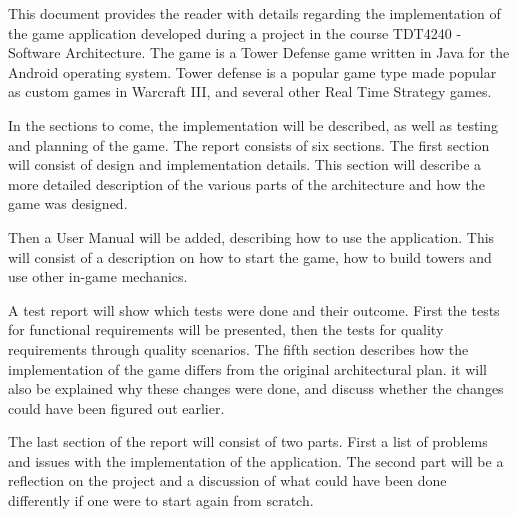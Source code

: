 This document provides the reader with details regarding the implementation of the game application developed during a project in the course TDT4240 - Software Architecture. The game is a Tower Defense game written in Java for the Android operating system. Tower defense is a popular game type made popular as custom games in Warcraft III, and several other Real Time Strategy games.\cite{wiki:td}

In the sections to come, the implementation will be described, as well as testing and planning of the game. The report consists of six sections.
The first section will consist of design and implementation details. This section will describe a more detailed description of the various parts of the architecture and how the game was designed.

Then a User Manual will be added, describing how to use the application. This will consist of a description on how to start the game, how to build towers and use other in-game mechanics.

A test report will show which tests were done and their outcome. First the tests for functional requirements will be presented, then the tests for quality requirements through quality scenarios. 
The fifth section describes how the implementation of the game differs from the original architectural plan. it will also be explained why these changes were done, and discuss whether the changes could have been figured out earlier.

The last section of the report will consist of two parts. First a list of problems and issues with the implementation of the application. The second part will be a reflection on the project and a discussion of what could have been done differently if one were to start again from scratch.
